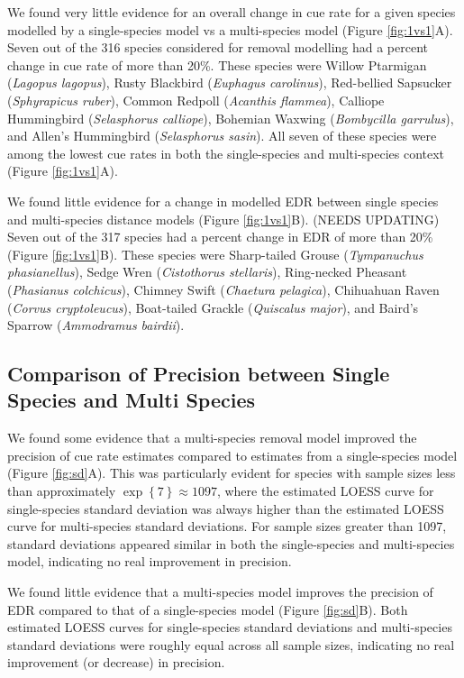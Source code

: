 \documentclass[12pt]{article}
\begin{document}
\par We found very little evidence for an overall change in cue rate for a given species modelled by a single-species model vs a multi-species model (Figure \ref{fig:1vs1}A).
Seven out of the 316 species considered for removal modelling had a percent change in cue rate of more than 20\%.
These species were Willow Ptarmigan (\textit{Lagopus lagopus}), Rusty Blackbird (\textit{Euphagus carolinus}), Red-bellied Sapsucker (\textit{Sphyrapicus ruber}), Common Redpoll (\textit{Acanthis flammea}), Calliope Hummingbird (\textit{Selasphorus calliope}), Bohemian Waxwing (\textit{Bombycilla garrulus}), and Allen's Hummingbird (\textit{Selasphorus sasin}).
All seven of these species were among the lowest cue rates in both the single-species and multi-species context (Figure \ref{fig:1vs1}A).

\par We found little evidence for a change in modelled EDR between single species and multi-species distance models (Figure \ref{fig:1vs1}B). 
(NEEDS UPDATING) Seven out of the 317 species had a percent change in EDR of more than 20\% (Figure \ref{fig:1vs1}B).
These species were Sharp-tailed Grouse (\textit{Tympanuchus phasianellus}), Sedge Wren (\textit{Cistothorus stellaris}), Ring-necked Pheasant (\textit{Phasianus colchicus}), Chimney Swift (\textit{Chaetura pelagica}), Chihuahuan Raven (\textit{Corvus cryptoleucus}), Boat-tailed Grackle (\textit{Quiscalus major}), and Baird's Sparrow (\textit{Ammodramus bairdii}).

\subsection{Comparison of Precision between Single Species and Multi Species}

\par We found some evidence that a multi-species removal model improved the precision of cue rate estimates compared to estimates from a single-species model (Figure \ref{fig:sd}A).
This was particularly evident for species with sample sizes less than approximately $\exp\left\{7\right\} \approx 1097$, where the estimated LOESS curve for single-species standard deviation was always higher than the estimated LOESS curve for multi-species standard deviations.
For sample sizes greater than 1097, standard deviations appeared similar in both the single-species and multi-species model, indicating no real improvement in precision.

\par We found little evidence that a multi-species model improves the precision of EDR compared to that of a single-species model (Figure \ref{fig:sd}B).
Both estimated LOESS curves for single-species standard deviations and multi-species standard deviations were roughly equal across all sample sizes, indicating no real improvement (or decrease) in precision.
\end{document}
